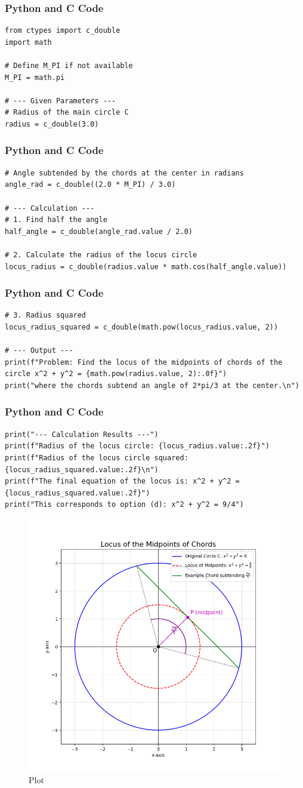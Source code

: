 \documentclass{beamer}
\begin{document}
\begin{frame}[fragile]
\frametitle{Python and C Code}
\begin{lstlisting}
from ctypes import c_double
import math

# Define M_PI if not available
M_PI = math.pi

# --- Given Parameters ---
# Radius of the main circle C
radius = c_double(3.0)
\end{lstlisting}
\end{frame}

\begin{frame}[fragile]
\frametitle{Python and C Code}
\begin{lstlisting}
# Angle subtended by the chords at the center in radians
angle_rad = c_double((2.0 * M_PI) / 3.0)

# --- Calculation ---
# 1. Find half the angle
half_angle = c_double(angle_rad.value / 2.0)

# 2. Calculate the radius of the locus circle
locus_radius = c_double(radius.value * math.cos(half_angle.value))
\end{lstlisting}
\end{frame}

\begin{frame}[fragile]
\frametitle{Python and C Code}
\begin{lstlisting}
# 3. Radius squared
locus_radius_squared = c_double(math.pow(locus_radius.value, 2))

# --- Output ---
print(f"Problem: Find the locus of the midpoints of chords of the circle x^2 + y^2 = {math.pow(radius.value, 2):.0f}")
print("where the chords subtend an angle of 2*pi/3 at the center.\n")
\end{lstlisting}
\end{frame}

\begin{frame}[fragile]
\frametitle{Python and C Code}
\begin{lstlisting}
print("--- Calculation Results ---")
print(f"Radius of the locus circle: {locus_radius.value:.2f}")
print(f"Radius of the locus circle squared: {locus_radius_squared.value:.2f}\n")
print(f"The final equation of the locus is: x^2 + y^2 = {locus_radius_squared.value:.2f}")
print("This corresponds to option (d): x^2 + y^2 = 9/4")

\end{lstlisting}
\end{frame}

\begin{figure}[H]
    \centering
    \includegraphics[width=0.7\columnwidth]{graph14.png}
    \caption{Plot}
    \label{fig:placeholder}
\end{figure}
\end{document}
